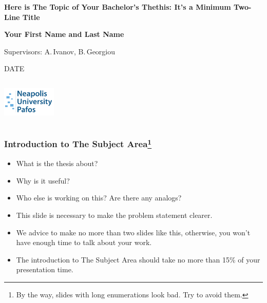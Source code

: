 \documentclass[12pt,aspectratio=169,hyperref={pdftex,unicode},xcolor=dvipsnames]{beamer}
\institute
{
    \begin{columns}
        \begin{column}{2.5cm}
            \includegraphics[height=30mm,keepaspectraticommon/nup-icon.png]
        \end{column}
        \begin{column}{3cm}
            Neapolis University Paphos
        \end{column}
    \end{columns}
}
\begin{document}
    \begin{frame}[plain]
        \begin{left}

        {\Large\textbf{Here is The Topic of Your Bachelor's Thethis: It's a Minimum Two-Line Title}}

            \vspace{5mm}
            \textbf{Your First Name and Last Name}

            {\small Supervisors: A.\,Ivanov, B.\,Georgiou}

            \vspace{10mm}
            DATE
        \end{left}

        \vspace{10mm}

        \begin{column}{1cm}
            \includegraphics[height=14mm,keepaspectratio]{./common/nup-logo.png}
        \end{column}
    \end{frame}



    \begin{frame}
        \frametitle{Introduction to The Subject Area\footnote{By the way, slides with long enumerations look bad. Try to avoid them.}}

        \begin{itemize}
            \item What is the thesis about?
            \item Why is it useful?
            \item Who else is working on this? Are there any analogs?
            \item This slide is necessary to make the problem statement clearer.
            \item We advice to make no more than two slides like this, otherwise, you won't have enough time to talk about your work.
            \item The introduction to The Subject Area should take no more than 15\% of your presentation time.
        \end{itemize}


    \end{frame}
\end{document}
